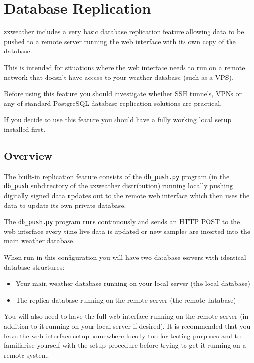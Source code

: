 \documentclass[a4paper,10pt,draft]{book}
\begin{document}
\chapter{Database Replication}
\label{cha_db_replication}

zxweather includes a very basic database replication feature allowing data to be pushed to a remote server running the web interface with its own copy of the database. 

This is intended for situations where the web interface needs to run on a remote network that doesn't have access to your weather database (such as a VPS).

Before using this feature you should investigate whether SSH tunnels, VPNs or any of standard PostgreSQL database replication solutions are practical.

If you decide to use this feature you should have a fully working local setup installed first.

\section{Overview}
The built-in replication feature consists of the \verb|db_push.py| program (in the \verb|db_push| subdirectory of the zxweather distribution) running locally pushing digitally signed data updates out to the remote web interface which then uses the data to update its own private database.

The \verb|db_push.py| program runs continuously and sends an HTTP POST to the web interface every time live data is updated or new samples are inserted into the main weather database.

When run in this configuration you will have two database servers with identical database structures:
\begin{itemize}
\item Your main weather database running on your local server (the local database)
\item The replica database running on the remote server (the remote database)
\end{itemize}

You will also need to have the full web interface running on the remote server (in addition to it running on your local server if desired). It is recommended that you have the web interface setup somewhere locally too for testing purposes and to familiarise yourself with the setup procedure before trying to get it running on a remote system.
\end{document}
